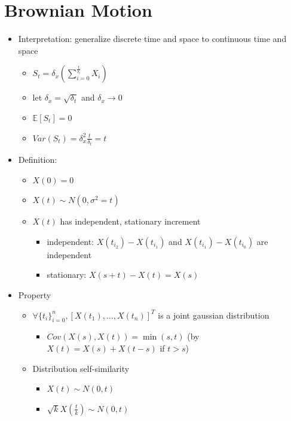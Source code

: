 \documentclass[a4paper]{article}
\begin{document}
\section{Brownian Motion}
\begin{itemize}
    \item Interpretation: generalize discrete time and space to continuous time and space
        \begin{itemize}
            \item $S_t = \delta_x (\sum_{i=0}^{\frac{t}{\delta_t}} X_i)$
            \item let $\delta_x = \sqrt{\delta_t}$ and $\delta_x \rightarrow 0$
            \item $\mathbb{E}[S_t] = 0$
            \item $\mathit{Var}(S_t) = \delta_x^2 \frac{t}{\delta_t} = t$
        \end{itemize}
    \item Definition:
        \begin{itemize}
            \item $X(0) = 0$
            \item $X(t) \sim N(0, \sigma^2 = t)$
            \item $X(t)$ has independent, stationary increment
                \begin{itemize}
                    \item independent: $X(t_{i_2}) - X(t_{i_1})$ and $X(t_{i_1}) - X(t_{i_0})$ are independent
                    \item stationary: $X(s + t) - X(t) = X(s)$
                \end{itemize}
        \end{itemize}
    \item Property
        \begin{itemize}
            \item $\forall \{t_i\}_{i=0}^n, [X(t_1), \dots, X(t_n)]^T$ is a joint gaussian distribution
                \begin{itemize}
                    \item $\mathit{Cov}(X(s), X(t)) = \min(s, t)$ (by $X(t) = X(s) + X(t-s)$ if $t > s$)
                \end{itemize}
            \item Distribution self-similarity
                \begin{itemize}
                    \item $X(t) \sim N(0, t)$
                    \item $\sqrt{k}X(\frac{t}{k}) \sim N(0, t)$

\end{itemize}
\end{itemize}
\end{itemize}
\end{document}
